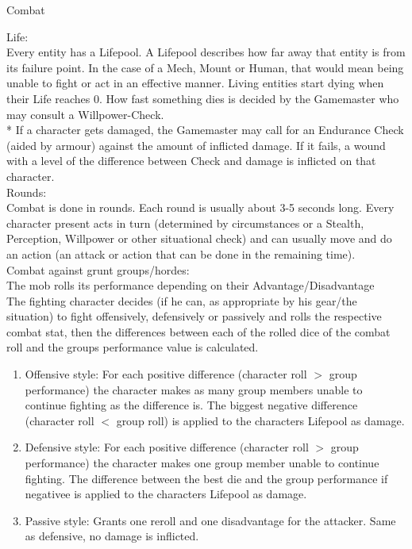 \documentclass{article}
\newcommand{\subhline}[1]{\begin{center}\large #1 \normalsize \end{center}}
\begin{document}
\subhline{Combat}

Life:\\
Every entity has a Lifepool. A Lifepool describes how far away that entity is from its failure point.
In the case of a Mech, Mount or Human, that would mean being unable to fight or act in an effective manner. Living
entities start dying when their Life reaches 0. How fast something dies is decided by the Gamemaster who may consult a
Willpower-Check.\\*
If a character gets damaged, the Gamemaster may call for an Endurance Check (aided by armour) against the amount
of inflicted damage. If it fails, a wound with a level of the difference between Check and damage is inflicted on
that character.\\

Rounds:\\
Combat is done in rounds. Each round is usually about 3-5 seconds long. Every character present acts in turn (determined
by circumstances or a Stealth, Perception, Willpower or other situational check) and can usually move and do an action
(an attack or action that can be done in the remaining time).\\

Combat against grunt groups/hordes:\\
The mob rolls its performance depending on their Advantage/Disadvantage\\
The fighting character decides (if he can, as appropriate by his gear/the situation) to fight offensively, defensively
or passively and rolls the respective combat stat, then the differences between each of the rolled dice of the combat roll and the groups
performance value is calculated.\\
\begin{enumerate}[label= - ]

\item  Offensive style: For each positive difference (character roll \(>\) group performance) the character makes as many group members
unable to continue fighting as the difference is. The biggest negative difference (character roll \(<\) group roll) is applied to
the characters Lifepool as damage.\\

\item Defensive style: For each positive difference (character roll \(>\) group performance) the character makes one group member
unable to continue fighting.  The difference between the best die and the group performance if negativee is applied to
the characters Lifepool as damage.\\

\item Passive style: Grants one reroll and one disadvantage for the attacker. Same as defensive, no damage is inflicted.\\
\end{enumerate}
\end{document}
